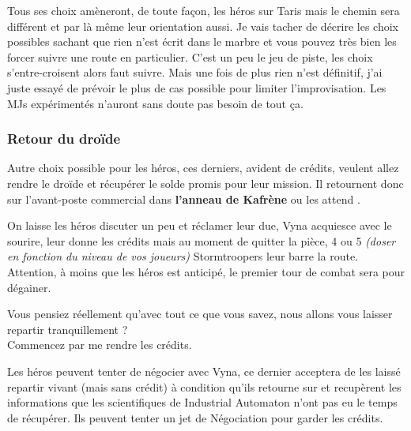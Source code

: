 Tous ses choix amèneront, de toute façon, les héros sur Taris mais le chemin sera différent et par là même leur orientation aussi. Je vais tacher de décrire les choix possibles sachant que rien n’est écrit dans le marbre et vous pouvez très bien les forcer suivre une route en particulier. C'est un peu le jeu de piste, les choix s'entre-croisent alors faut suivre. Mais une fois de plus rien n'est définitif, j'ai juste essayé de prévoir le plus de cas possible pour limiter l'improvisation. Les MJs expérimentés n'auront sans doute pas besoin de tout ça.


\subsubsection{Retour du droïde} \label{sec:retour-du-droide}

Autre choix possible pour les héros, ces derniers, avident de crédits, veulent allez rendre le droïde et récupérer le solde promis pour leur mission. Il retournent donc sur l'avant-poste commercial dans \textbf{l'anneau de Kafrène} ou les attend .

On laisse les héros discuter un peu et réclamer leur due, Vyna acquiesce avec le sourire, leur donne les crédits mais au moment de quitter la pièce, 4 ou 5 \textit{(doser en fonction du niveau de vos joueurs)} Stormtroopers leur barre la route. Attention, à moins que les héros est anticipé, le premier tour de combat sera pour dégainer.

\begin{quotebox}
    Vous pensiez réellement qu'avec tout ce que vous savez, nous allons vous laisser repartir tranquillement ?\\
    Commencez par me rendre les crédits.
\end{quotebox}

Les héros peuvent tenter de négocier avec Vyna, ce dernier acceptera de les laissé repartir vivant (mais sans crédit) à condition qu'ils retourne sur  et recupèrent les informations que les scientifiques de Industrial Automaton n'ont pas eu le temps de récupérer. Ils peuvent tenter un jet de Négociation pour garder les crédits.\\

